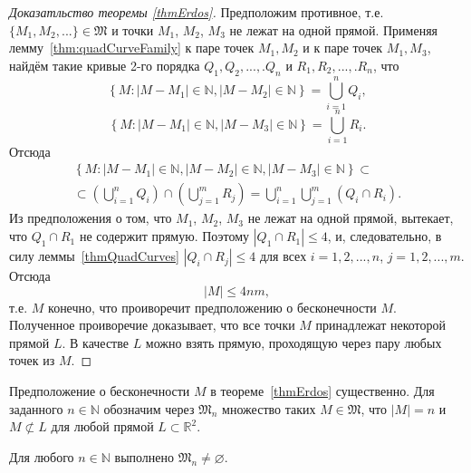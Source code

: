 \begin{proof}[Доказатльство теоремы \ref{thmErdos}]
	Предположим противное,
	т.е. $\{M_1, M_2, ... \}\in\mathfrak{M}$
	и точки $M_1$, $M_2$, $M_3$ не лежат на одной прямой.
	Применяя лемму~\ref{thm:quadCurveFamily}
	к паре точек $M_1, M_2$ и к паре точек $M_1, M_3$,
	найдём такие кривые 2-го порядка
	$Q_1, Q_2,...,.Q_n$ и $R_1, R_2,...,.R_n$, что
	\begin{equation*}
		\left\{
			M: |M-M_1|\in\mathbb{N}, |M-M_2|\in\mathbb{N}
		\right\}
		=\bigcup_{i=1}^n Q_i
		,
	\end{equation*}
	\begin{equation*}
		\left\{
			M: |M-M_1|\in\mathbb{N}, |M-M_3|\in\mathbb{N}
		\right\}
		=\bigcup_{i=1}^n R_i
		.
	\end{equation*}
	Отсюда
	\begin{multline*}
		\left\{
			M:
			|M-M_1|\in\mathbb{N},
			|M-M_2|\in\mathbb{N},
			|M-M_3|\in\mathbb{N}
		\right\}
		\subset
		\\ \subset
		\left(\bigcup_{i=1}^n Q_i\right)
		\cap
		\left(\bigcup_{j=1}^m R_j\right)
		=
		\bigcup_{i=1}^n \bigcup_{j=1}^m \left( Q_i \cap R_i \right)
		.
	\end{multline*}
	Из предположения о том, что $M_1$, $M_2$, $M_3$
	не лежат на одной прямой, вытекает,
	что $Q_1\cap R_1$ не содержит прямую.
	Поэтому $|Q_1\cap R_1|\leqslant 4$,
	и, следовательно, в силу леммы~\ref{thmQuadCurves}
	$|Q_i\cap R_j|\leqslant 4$
	для всех $i=1,2,...,n$, $j=1,2,...,m$.
	Отсюда
	\begin{equation*}
		|M| \leqslant 4nm
		,
	\end{equation*}
	т.е. $M$ конечно,
	что проиворечит предположению о бесконечности $M$.
	Полученное проиворечие доказывает, что все точки $M$
	принадлежат некоторой прямой $L$.
	В качестве $L$ можно взять прямую,
	проходящую через пару любых точек из $M$.
\end{proof}

Предположение о бесконечности $M$ в теореме~\ref{thmErdos} существенно.
Для заданного $n\in\mathbb{N}$ обозначим через $\mathfrak{M}_n$
множество таких $M\in\mathfrak{M}$, что
$|M|=n$ и $M \not\subset L$ для любой прямой $L \subset\mathbb{R}^2$.

\begin{theorem}
	Для любого $n\in\mathbb{N}$ выполнено $\mathfrak{M}_n\neq\varnothing$.
\end{theorem}

